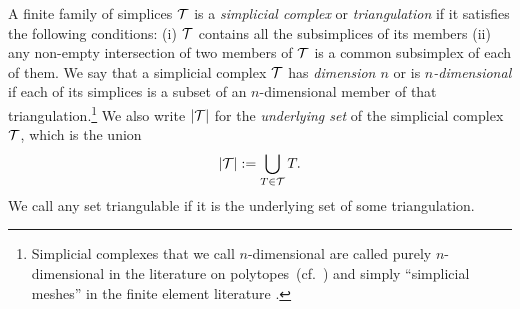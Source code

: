 \documentclass[10pt,a4paper]{article}
\newcommand\cye[1]{%
\protect\leavevmode
\begingroup
    \color{blue}%
    #1%
\endgroup
}
\begin{document}
A finite family of simplices ${\mathcal T}$ is a \emph{simplicial complex} or \emph{triangulation} if it satisfies the following conditions: 
(i) ${\mathcal T}$ contains all the subsimplices of its members (ii) any non-empty intersection of two members of ${\mathcal T}$ is a common subsimplex of each of them. 
We say that a simplicial complex ${\mathcal T}$ has \textit{dimension $n$} or is \textit{$n$-dimensional} if each of its simplices is a subset of an $n$-dimensional member of that triangulation.\footnote{Simplicial complexes that we call $n$-dimensional are called purely $n$-dimensional in the literature on polytopes~(cf.\ \cite{ziegler1995lectures}) \cye{and simply ``simplicial meshes'' in the finite element literature}.} 
We also write $\left| {\mathcal T} \right|$ for the \textit{underlying set} of the simplicial complex ${\mathcal T}$, which is the union 
\begin{align*}
    \left| {\mathcal T} \right| := \bigcup_{ T \in {\mathcal T} } T
    .
\end{align*}
We call any set triangulable if it is the underlying set of some triangulation. 
\\

\begin{comment}
\begin{remark}
    Our main interest in this manuscript are finite triangulations of compact sets. 
    There is another reason why we insist on the triangulation being finite: 
    if we do not require our simplicial complexes to be finite,
    then a reasonable definition of simplicial complex would need additional topological conditions. 
    For example, if we modify our definition of simplicial complex to be infinite, 
    then any subset of Euclidean space would give rise to an ``infinite $0$-dimensional complex''. But this obviously does not reflect the topology. 
    A more interesting such example is this:
    the Cantor set $\calC \subseteq [0,1]$ is a compact set 
    that underlies an ``infinite $0$-dimensional simplicial complex''.
    If we place $\calC$ on the x-axis of a 2D coordinate system 
    and connect each member of $\calC$ to $(0,1) \in \bbR^{2}$ via a straight line segment, 
    then the resulting set is still compact, even path-connected,  
    but has an ``infinite $1$-dimensional triangulation''.
    However, none of these infinite families are infinite simplicial complexes in the sense of geometric topology~\cite{lee2011topological}. 
\end{remark}
\end{comment}
\end{document}
